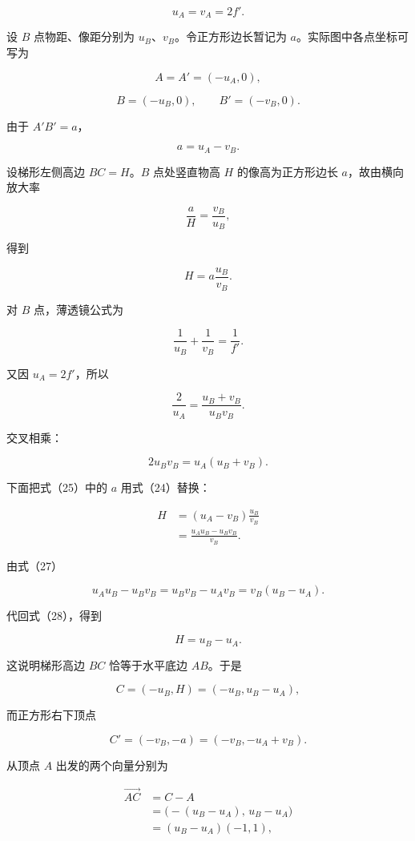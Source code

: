 \documentclass[12pt,a4paper,UTF8]{ctexart}
\begin{document}
\[
u_A=v_A=2f'.
\tag{21}
\]

设 \(B\) 点物距、像距分别为 \(u_B\)、\(v_B\)。令正方形边长暂记为
\(a\)。实际图中各点坐标可写为

\[
A=A'=(-u_A,0),
\tag{22}
\]

\[
B=(-u_B,0),
\qquad
B'=(-v_B,0).
\tag{23}
\]

由于 \(A'B'=a\)，

\[
a=u_A-v_B.
\tag{24}
\]

设梯形左侧高边 \(BC=H\)。\(B\) 点处竖直物高 \(H\) 的像高为正方形边长
\(a\)，故由横向放大率

\[
\frac aH=\frac{v_B}{u_B},
\]

得到

\[
H=a\frac{u_B}{v_B}.
\tag{25}
\]

对 \(B\) 点，薄透镜公式为

\[
\frac1{u_B}+\frac1{v_B}=\frac1{f'}.
\tag{26}
\]

又因 \(u_A=2f'\)，所以

\[
\frac2{u_A}
=\frac{u_B+v_B}{u_Bv_B}.
\]

交叉相乘：

\[
2u_Bv_B=u_A(u_B+v_B).
\tag{27}
\]

下面把式（25）中的 \(a\) 用式（24）替换：

\[
\begin{aligned}
H
&=(u_A-v_B)\frac{u_B}{v_B}\\
&=\frac{u_Au_B-u_Bv_B}{v_B}.
\end{aligned}
\tag{28}
\]

由式（27）

\[
u_Au_B-u_Bv_B
=u_Bv_B-u_Av_B
=v_B(u_B-u_A).
\]

代回式（28），得到

\[
\boxed{H=u_B-u_A}.
\tag{29}
\]

这说明梯形高边 \(BC\) 恰等于水平底边 \(AB\)。于是

\[
C=(-u_B,H)
=(-u_B,u_B-u_A),
\tag{30}
\]

而正方形右下顶点

\[
C'=(-v_B,-a)
=(-v_B,-u_A+v_B).
\tag{31}
\]

从顶点 \(A\) 出发的两个向量分别为

\[
\begin{aligned}
\overrightarrow{AC}
&=C-A\\
&=\bigl(-(u_B-u_A),\,u_B-u_A\bigr)\\
&=(u_B-u_A)(-1,1),
\end{aligned}
\tag{32}
\]
\end{document}
